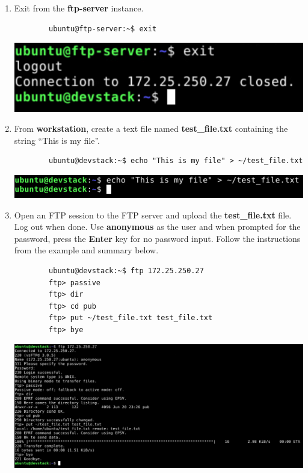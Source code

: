 \documentclass[letterpaper, 12pt]{article}
\begin{document}
\begin{enumerate}
    \item Exit from the \textbf{ftp-server} instance.
    \begin{lstlisting}
        ubuntu@ftp-server:~$ exit
    \end{lstlisting}

    \begin{center}
        \includegraphics[width=\linewidth]{images/part2/step17.png}
    \end{center}

    \item From \textbf{workstation}, create a text file named \textbf{test\_file.txt} containing the string ``This is my
    file''.
    \begin{lstlisting}
        ubuntu@devstack:~$ echo "This is my file" > ~/test_file.txt
    \end{lstlisting}

    \begin{center}
        \includegraphics[width=\linewidth]{images/part2/step18.png}
    \end{center}

    \item Open an FTP session to the FTP server and upload the \textbf{test\_file.txt} file. Log out when done. Use
    \textbf{anonymous} as the user and when prompted for the password, press the \textbf{Enter} key for no password
    input. Follow the instructions from the example and summary below.
    \begin{lstlisting}
        ubuntu@devstack:~$ ftp 172.25.250.27
        ftp> passive
        ftp> dir
        ftp> cd pub
        ftp> put ~/test_file.txt test_file.txt
        ftp> bye
    \end{lstlisting}

    \begin{center}
        \includegraphics[width=\linewidth]{images/part2/step19.png}
    \end{center}


\end{enumerate}
\end{document}
